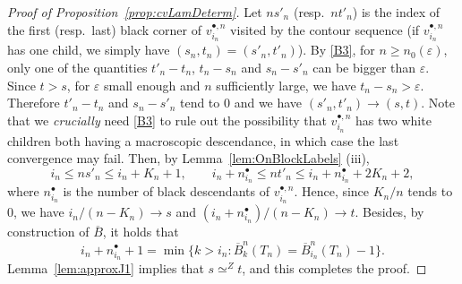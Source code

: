 \documentclass[10pt]{amsart}
\theoremstyle{definition}\newtheorem{defi}[theo]{Definition}\newtheorem{rema}[theo]{Remark}\newtheorem{exam}[theo]{Example}\newtheorem{exem}[theo]{Example}\newtheorem{nota}[theo]{Notation}
\def\eps{\varepsilon}
\def\oB{\overline{B}}
\begin{document}
\begin{proof}[Proof of Proposition~\ref{prop:cvLamDeterm}]
Let $n s'_{n}$ (resp.~$n t'_{n}$) is the index of the first (resp.~last) black corner of $v^{\bullet,n}_{i_{n}}$ visited by the contour sequence (if $v^{\bullet,n}_{i_{n}}$ has one child, we simply have $(s_{n},t_{n})=(s'_{n},t'_{n})$).
By \ref{B3}, for $n \ge n_0(\eps)$, only one of the quantities $t'_n-t_n$, $t_n-s_n$ and $s_n-s'_n$
can be bigger than $\eps$.
Since $t>s$, for $\eps$ small enough and $n$ sufficiently large, we have $t_n-s_n>\eps$.
Therefore $t'_n-t_n$ and $s_n-s'_n$ tend to $0$ and
we have $(s'_{n},t'_{n}) \rightarrow (s,t)$.
Note that we \emph{crucially} need \ref{B3} to rule out the possibility that  $v^{\bullet,n}_{i_{n}}$ has two white children both having a macroscopic descendance, in which case the last convergence may fail.
Then, by Lemma~\ref{lem:OnBlockLabels}   (iii),
  \[ i_{n} \leq n s'_{n} \leq i_{n}+  K_{n}+1, \qquad i_{n}+n^{\bullet}_{i_{n}} \leq n t'_{n} \leq   i_{n}+n^{\bullet}_{i_{n}} +2 K_{n}+2,\]
where $n^{\bullet}_{i_{n}}$ is the number of black descendants of $ v^{\bullet,n}_{i_{n}}$.
Hence, since $K_n/n$ tends to $0$, we have $i_{n}/(n-K_{n}) \rightarrow s$ and $  (i_{n}+n^{\bullet}_{i_{n}})/(n-K_{n}) \rightarrow t$.
Besides, by construction of $\overline{B}$, it holds that
\[i_{n}+n^{\bullet}_{i_{n}}+1= \min \{k>i_{n}: \oB^{n}_{k}(T_{n}) =  \oB^{n}_{i_{n}}(T_{n})-1\}.\]
Lemma~\ref{lem:approxJ1} implies that $s \simeq^Z t$, and this completes the proof.
\end{proof}
\end{document}
